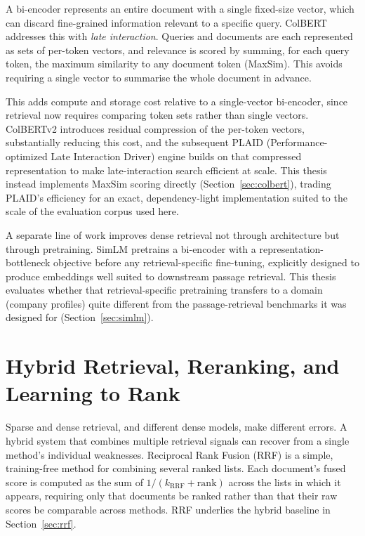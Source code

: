 \documentclass[a4paper,oneside,bibliography=totoc]{scrbook}
\begin{document}
A bi-encoder represents an entire document with a single fixed-size vector, which can discard fine-grained information relevant to a specific query. ColBERT \citep{khattab2020colbert} addresses this with \emph{late interaction}. Queries and documents are each represented as sets of per-token vectors, and relevance is scored by summing, for each query token, the maximum similarity to any document token (MaxSim). This avoids requiring a single vector to summarise the whole document in advance.

This adds compute and storage cost relative to a single-vector bi-encoder, since retrieval now requires comparing token sets rather than single vectors. ColBERTv2 \citep{santhanam2022colbertv2} introduces residual compression of the per-token vectors, substantially reducing this cost, and the subsequent PLAID (Performance-optimized Late Interaction Driver) engine \citep{santhanam2022plaid} builds on that compressed representation to make late-interaction search efficient at scale. This thesis instead implements MaxSim scoring directly (Section~\ref{sec:colbert}), trading PLAID's efficiency for an exact, dependency-light implementation suited to the scale of the evaluation corpus used here.

A separate line of work improves dense retrieval not through architecture but through pretraining. SimLM \citep{wang2022simlm} pretrains a bi-encoder with a representation-bottleneck objective before any retrieval-specific fine-tuning, explicitly designed to produce embeddings well suited to downstream passage retrieval. This thesis evaluates whether that retrieval-specific pretraining transfers to a domain (company profiles) quite different from the passage-retrieval benchmarks it was designed for (Section~\ref{sec:simlm}).

\section{Hybrid Retrieval, Reranking, and Learning to Rank}
\label{sec:lit_hybrid}

Sparse and dense retrieval, and different dense models, make different errors. A hybrid system that combines multiple retrieval signals can recover from a single method's individual weaknesses. Reciprocal Rank Fusion (RRF) \citep{cormack2009reciprocal} is a simple, training-free method for combining several ranked lists. Each document's fused score is computed as the sum of $1/(k_{\mathrm{RRF}} + \mathrm{rank})$ across the lists in which it appears, requiring only that documents be ranked rather than that their raw scores be comparable across methods. RRF underlies the hybrid baseline in Section~\ref{sec:rrf}.
\end{document}
